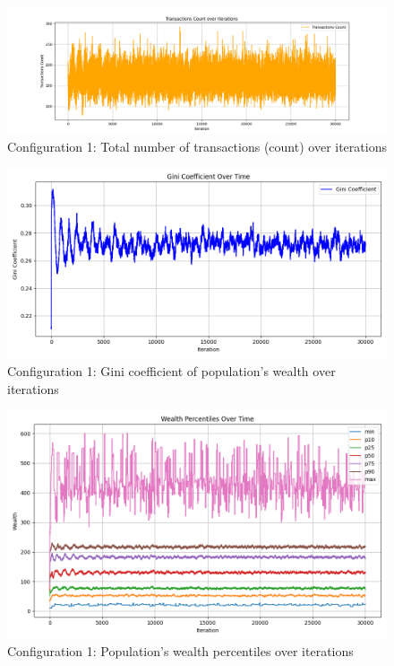 \documentclass[english]{projectreport}
\begin{document}
    \begin{figure}[H]
        \centering
        \includegraphics[width=0.8\linewidth]{metrics_config1/metrics_config1_total_transactions_count.png}
        \caption{Configuration 1: Total number of transactions (count) over iterations}
        \label{fig:c0-total_transactions_count}
    \end{figure}

    \begin{figure}[H]
        \centering
        \includegraphics[width=0.8\linewidth]{metrics_config1/metrics_config1_gini_coefficient.png}
        \caption{Configuration 1: Gini coefficient of population's wealth over iterations}
        \label{fig:c0-gini_coefficient}
    \end{figure}

    \begin{figure}[H]
        \centering
        \includegraphics[width=0.8\linewidth]{metrics_config1/metrics_config1_wealth_perc_time.png}
        \caption{Configuration 1: Population's wealth percentiles over iterations}
        \label{fig:c0-wealth_perc_time}
    \end{figure}
\end{document}
